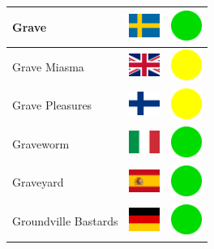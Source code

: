 \documentclass[12pt, a4paper, twoside]{report}
\begin{document}
\begin{center}
\begin{longtable}{|p{5cm}|p{2cm}|p{2cm}|}
Grave & \includegraphics[width=1cm]{4x3/se} & \includegraphics[width=1cm]{likes/y} \\ \hline
Grave Miasma & \includegraphics[width=1cm]{4x3/gb} & \includegraphics[width=1cm]{likes/m} \\ \hline
Grave Pleasures & \includegraphics[width=1cm]{4x3/fi} & \includegraphics[width=1cm]{likes/m} \\ \hline
Graveworm & \includegraphics[width=1cm]{4x3/it} & \includegraphics[width=1cm]{likes/y} \\ \hline
Graveyard & \includegraphics[width=1cm]{4x3/es} & \includegraphics[width=1cm]{likes/y} \\ \hline
Groundville Bastards & \includegraphics[width=1cm]{4x3/de} & \includegraphics[width=1cm]{likes/y} \\ \hline

\end{longtable}
\end{center}
\end{document}
